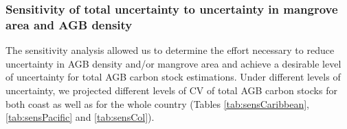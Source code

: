 \documentclass[review, authoryear]{elsarticle}   	%
\begin{document}
\subsubsection{Sensitivity of total uncertainty to uncertainty in mangrove area and AGB density}


The sensitivity analysis allowed us to determine the effort necessary to reduce uncertainty in AGB density and/or mangrove area and achieve a desirable level of uncertainty for total AGB carbon stock estimations. Under different levels of uncertainty, we projected different levels of CV of total AGB carbon stocks for both coast as well as for the whole country (Tables \ref{tab:sensCaribbean}, \ref{tab:sensPacific} and \ref{tab:sensCol}). 
\end{document}

